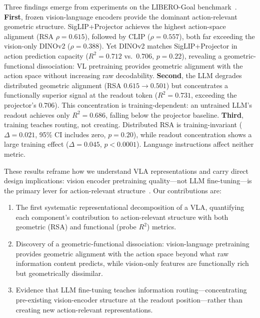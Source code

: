 Three findings emerge from experiments on the LIBERO-Goal benchmark~\cite{liu2023_libero}.
\textbf{First}, frozen vision-language encoders provide the dominant action-relevant geometric structure.
SigLIP+Projector achieves the highest action-space alignment (RSA $\rho = 0.615$), followed by CLIP ($\rho = 0.557$), both far exceeding the vision-only DINOv2 ($\rho = 0.388$).
Yet DINOv2 matches SigLIP+Projector in action prediction capacity ($R^2 = 0.712$ vs.\ $0.706$, $p = 0.22$), revealing a geometric-functional dissociation: VL pretraining provides geometric alignment with the action space without increasing raw decodability.
\textbf{Second}, the LLM degrades distributed geometric alignment (RSA $0.615 \to 0.501$) but concentrates a functionally superior signal at the readout token ($R^2 = 0.731$, exceeding the projector's $0.706$).
This concentration is training-dependent: an untrained LLM's readout achieves only $R^2 = 0.686$, falling below the projector baseline.
\textbf{Third}, training teaches routing, not creating.
Distributed RSA is training-invariant ($\Delta = 0.021$, 95\% CI includes zero, $p = 0.20$), while readout concentration shows a large training effect ($\Delta = 0.045$, $p < 0.0001$).
Language instructions affect neither metric.

These results reframe how we understand VLA representations and carry direct design implications: vision encoder pretraining quality---not LLM fine-tuning---is the primary lever for action-relevant structure~\cite{haon2025}.
Our contributions are:
\begin{enumerate}[leftmargin=*,itemsep=2pt,topsep=2pt]
    \item The first systematic representational decomposition of a VLA, quantifying each component's contribution to action-relevant structure with both geometric (RSA) and functional (probe $R^2$) metrics.
    \item Discovery of a geometric-functional dissociation: vision-language pretraining provides geometric alignment with the action space beyond what raw information content predicts, while vision-only features are functionally rich but geometrically dissimilar.
    \item Evidence that LLM fine-tuning teaches information routing---concentrating pre-existing vision-encoder structure at the readout position---rather than creating new action-relevant representations.
\end{enumerate}

